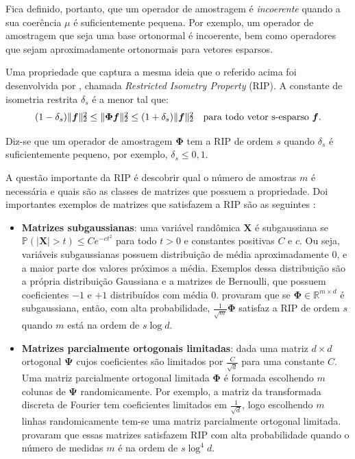 \documentclass[cic,tc]{iiufrgs}
\def\SPSB#1#2{\rlap{\textsuperscript{#1}}\SB{#2}}
\def\SB#1{\textsubscript{#1}}
\renewcommand{\vec}[1]{\bm{#1}}
\newcommand{\mat}[1]{\bm{#1}}
\begin{document}
Fica definido, portanto, que um operador de amostragem é \textit{incoerente} quando a sua coerência $\mu$ é 
suficientemente pequena. Por exemplo, um operador de amostragem que seja uma base ortonormal é incoerente, bem como
operadores que sejam aproximadamente ortonormais para vetores esparsos.

Uma propriedade que captura a mesma ideia que o referido acima foi desenvolvida por \citet{CandesSignalRecovery}, chamada 
\textit{Restricted Isometry Property} (RIP). A constante de isometria restrita 
$\delta_s$ é a menor tal que:
\begin{equation}
    \label{eq:rip}
    (1 - \delta_s)\lVert \vec{f} \rVert\SPSB{2}{2} \le \lVert \mathbf{\Phi} \vec{f} \rVert \SPSB{2}{2} \le 
    (1 + \delta_s)\lVert \vec{f} \rVert\SPSB{2}{2} \hspace{1em} \text{para todo vetor s-esparso } \vec{f}.
\end{equation}

Diz-se que um operador de amostragem $\mathbf{\Phi}$ tem a RIP de ordem $s$ quando $\delta_s$ é suficientemente
pequeno, por exemplo, $\delta_s \le 0,1$.

A questão importante da RIP é descobrir qual o número de amostras $m$ é necessária e quais são as 
classes de matrizes que possuem a propriedade. Doi importantes exemplos de matrizes que satisfazem a RIP são
as seguintes \cite{chen2015compressed}: 
\begin{itemize}
    \item \textbf{Matrizes subgaussianas}: uma variável randômica $\mat{X}$ é subgaussiana se 
    $\mathbb{P}(|\mat{X}| > t) \le Ce^{-ct^2}$ para todo $t>0$ e constantes positivas $C$ e $c$. Ou seja,
    variáveis subgaussianas possuem distribuição de média aproximadamente $0$, e a maior parte dos valores
    próximos a média. Exemplos dessa distribuição são a própria distribuição Gaussiana e a matrizes de 
    Bernoulli, que possuem coeficientes $-1$ e $+1$ distribuídos com média $0$. \citet{Mendelson2008} provaram que
    se $\mat{\Phi} \in \mathbb{R}^{m\times d}$ é subgaussiana, então, com alta probabilidade, $\frac{1}{\sqrt{m}}\mat{\Phi}$
    satisfaz a RIP de ordem $s$ quando $m$ está na ordem de $s\log{d}$.
    \item \textbf{Matrizes parcialmente ortogonais limitadas}: dada uma matriz $d\times d$ ortogonal $\mat{\Psi}$
    cujos coeficientes são limitados por $\frac{C}{\sqrt{d}}$ para uma constante $C$. Uma matriz parcialmente
    ortogonal limitada $\mat{\Phi}$ é formada escolhendo $m$ colunas de $\mat{\Psi}$ randomicamente.
    Por exemplo, a matriz da transformada discreta de Fourier tem coeficientes limitados em $\frac{1}{\sqrt{d}}$,
    logo escolhendo $m$ linhas randomicamente tem-se uma matriz parcialmente ortogonal limitada.
    \citet{rudelson2008sparse} provaram que essas matrizes satisfazem RIP com alta probabilidade quando
    o número de medidas $m$ é na ordem de $s\log^4{d}$.
\end{itemize}
\end{document}
